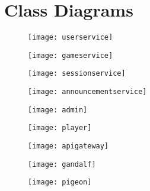 \documentclass{article}
\begin{document}
\section*{Class Diagrams}

\begin{figure}[!ht]
  \centering
    \texttt{[image: userservice]}
\end{figure}
\begin{figure}[!ht]
  \centering
    \texttt{[image: gameservice]}
\end{figure}
\begin{figure}[!ht]
  \centering
    \texttt{[image: sessionservice]}
\end{figure}
\begin{figure}[!ht]
  \centering
    \texttt{[image: announcementservice]}
\end{figure}

\begin{figure}[!ht]
  \centering
    \texttt{[image: admin]}
\end{figure}
\begin{figure}[!ht]
  \centering
    \texttt{[image: player]}
\end{figure}

\begin{figure}[!ht]
  \centering
    \texttt{[image: apigateway]}
\end{figure}

\begin{figure}[!ht]
  \centering
    \texttt{[image: gandalf]}
\end{figure}

\begin{figure}[!ht]
  \centering
    \texttt{[image: pigeon]}
\end{figure}
\end{document}
